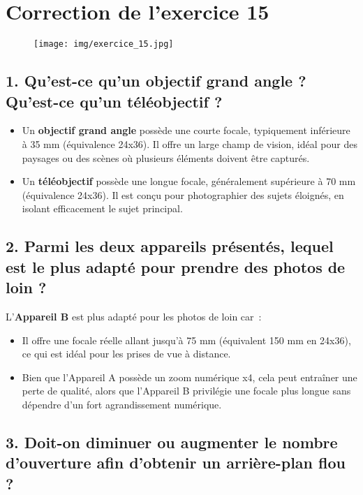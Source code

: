 \documentclass[answers]{exam}
\begin{document}
\section*{Correction de l'exercice 15}


\begin{figure}[H]
  \centering
  \texttt{[image: img/exercice\_15.jpg]}
\end{figure}

\subsection*{1. Qu'est-ce qu'un objectif grand angle ? Qu'est-ce qu'un téléobjectif ?}

\begin{itemize}
    \item Un \textbf{objectif grand angle} possède une courte focale, typiquement inférieure à 35 mm (équivalence 24x36). Il offre un large champ de vision, idéal pour des paysages ou des scènes où plusieurs éléments doivent être capturés.
    \item Un \textbf{téléobjectif} possède une longue focale, généralement supérieure à 70 mm (équivalence 24x36). Il est conçu pour photographier des sujets éloignés, en isolant efficacement le sujet principal.
\end{itemize}

\subsection*{2. Parmi les deux appareils présentés, lequel est le plus adapté pour prendre des photos de loin ?}

L'\textbf{Appareil B} est plus adapté pour les photos de loin car :
\begin{itemize}
    \item Il offre une focale réelle allant jusqu'à 75 mm (équivalent 150 mm en 24x36), ce qui est idéal pour les prises de vue à distance.
    \item Bien que l'Appareil A possède un zoom numérique x4, cela peut entraîner une perte de qualité, alors que l'Appareil B privilégie une focale plus longue sans dépendre d'un fort agrandissement numérique.
\end{itemize}

\subsection*{3. Doit-on diminuer ou augmenter le nombre d'ouverture afin d'obtenir un arrière-plan flou ?}
\end{document}
